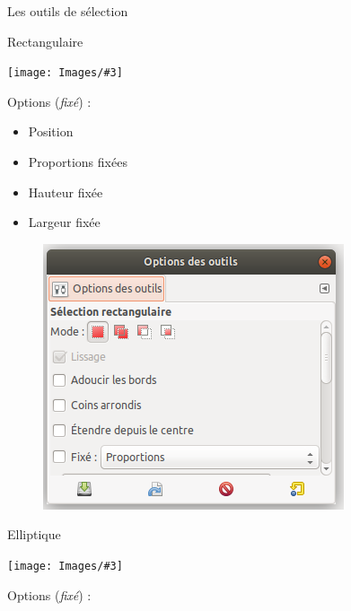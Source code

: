 \documentclass[10pt,svgnames,usenames,table]{beamer}
\newcommand{\tool}[3]{%
	\begin{minipage}{0.40\textwidth}
	\item #1	
	\end{minipage}\hfill
	\begin{minipage}{0.20\textwidth}
	\begin{flushright}
	\keys{#2}
	\end{flushright}
	\end{minipage}
	\begin{minipage}{0.06\textwidth}
	\fbox{ou}
	\end{minipage}
	\begin{minipage}{0.1\textwidth}
	\texttt{[image: Images/\#3]}
	\end{minipage}
}
\begin{document}
\begin{frame}[allowframebreaks]{Les outils de sélection}
\begin{enumerate}

	
	\tool{Rectangulaire}{R}{rectangle.png}
	
	\vspace{0.5cm}
	\begin{minipage}[t]{0.45\textwidth}
	Options (\textit{fixé}) : 
		
	\begin{itemize}
		\item Position
		\item Proportions fixées
		\item Hauteur fixée
		\item Largeur fixée
	\end{itemize}
	\end{minipage}
	\begin{minipage}[t]{0.45\textwidth}
	
	\begin{figure}
        	\centering
        	\includegraphics[width=\textwidth]{Images/option_outil} 
	\end{figure}
	\end{minipage}
	
	\framebreak
	
	
	\tool{Elliptique}{E}{ellipse.png}	
	
	\vspace{0.5cm}
	\begin{minipage}[t]{0.45\textwidth}
	Options (\textit{fixé}) : 
		

\end{minipage}
\end{enumerate}
\end{frame}
\end{document}
